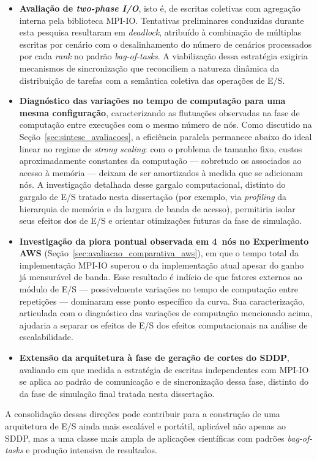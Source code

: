 \begin{itemize}
  \item \textbf{Avaliação de \textit{two-phase I/O}}, isto é, de
        escritas coletivas com agregação interna pela biblioteca
        MPI-IO. Tentativas preliminares conduzidas durante esta
        pesquisa resultaram em \textit{deadlock}, atribuído à
        combinação de múltiplas escritas por cenário com o
        desalinhamento do número de cenários processados por cada
        \textit{rank} no padrão \textit{bag-of-tasks}. A
        viabilização dessa estratégia exigiria mecanismos de
        sincronização que reconciliem a natureza dinâmica da
        distribuição de tarefas com a semântica coletiva das
        operações de E/S.

  \item \textbf{Diagnóstico das variações no tempo de computação para
        uma mesma configuração}, caracterizando as flutuações
        observadas na fase de computação entre execuções com o mesmo
        número de nós. Como discutido na Seção~\ref{sec:sintese_avaliacoes},
        a eficiência paralela permanece abaixo do ideal linear no
        regime de \textit{strong scaling}: com o problema de tamanho
        fixo, custos aproximadamente constantes da computação ---
        sobretudo os associados ao acesso à memória --- deixam de ser
        amortizados à medida que se adicionam nós. A investigação
        detalhada desse gargalo computacional, distinto do gargalo de
        E/S tratado nesta dissertação (por exemplo, via
        \textit{profiling} da hierarquia de memória e da largura de
        banda de acesso), permitiria isolar seus efeitos dos de E/S e
        orientar otimizações futuras da fase de simulação.

  \item \textbf{Investigação da piora pontual observada em 4~nós no
        Experimento AWS} (Seção~\ref{sec:avaliacao_comparativa_aws}),
        em que o tempo total da implementação MPI-IO superou o da
        implementação atual apesar do ganho já mensurável de banda.
        Esse resultado é indício de que fatores externos ao módulo de
        E/S --- possivelmente variações no tempo de computação entre
        repetições --- dominaram esse ponto específico da curva. Sua
        caracterização, articulada com o diagnóstico das variações de
        computação mencionado acima, ajudaria a separar os efeitos de
        E/S dos efeitos computacionais na análise de escalabilidade.

  \item \textbf{Extensão da arquitetura à fase de geração de cortes do
        SDDP}, avaliando em que medida a estratégia de escritas
        independentes com MPI-IO se aplica ao padrão de comunicação e
        de sincronização dessa fase, distinto do da fase de simulação
        final tratada nesta dissertação.
\end{itemize}

A consolidação dessas direções pode contribuir para a construção de
uma arquitetura de E/S ainda mais escalável e portátil, aplicável
não apenas ao SDDP, mas a uma classe mais ampla de aplicações
científicas com padrões \textit{bag-of-tasks} e produção intensiva
de resultados.
